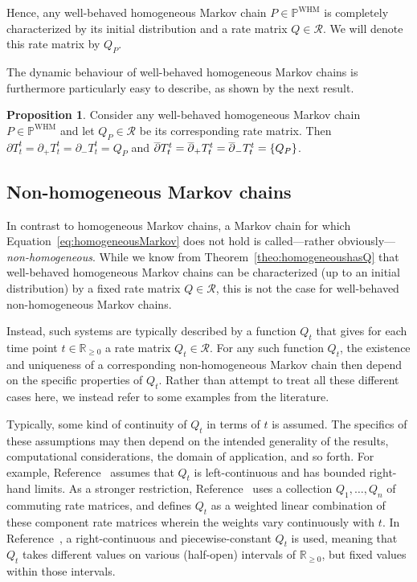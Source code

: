 \documentclass[10pt,a4paper]{paper}
\theoremstyle{definition}
\newtheorem{proposition}[theorem]{Proposition}
\newcommand{\reals}{\mathbb{R}}
\newcommand{\realsnonneg}{\reals_{\geq 0}}
\newcommand{\processes}{\mathbb{P}}
\newcommand{\whmprocesses}{\processes^{\mathrm{WHM}}}
\begin{document}
Hence, any well-behaved homogeneous Markov chain $P\in\whmprocesses$ is completely characterized by its initial distribution and a rate matrix $Q\in\mathcal{R}$. We will denote this rate matrix by $Q_P$.


The dynamic behaviour of well-behaved homogeneous Markov chains is furthermore particularly easy to describe, as shown by the next result.
\begin{proposition}\label{prop:Q_is_singleton_deriv_for_homogen}
Consider any well-behaved homogeneous Markov chain $P\in\whmprocesses$ and let $Q_P\in\mathcal{R}$ be its corresponding rate matrix. Then $\partial T_t^t=\partial_+T_t^t=\partial_-T_t^t=Q_P$ and $\smash{\overline{\partial}}T_t^t=\smash{\overline{\partial}_+}T_t^t=\smash{\overline{\partial}_-}T_t^t=\{Q_P\}$.%
\end{proposition}

\subsection{Non-homogeneous Markov chains}\label{sec:nonhomogen_markov}

In contrast to homogeneous Markov chains, a Markov chain for which Equation~\eqref{eq:homogeneousMarkov} does not hold is called---rather obviously---\emph{non-homogeneous}. While we know from Theorem~\ref{theo:homogeneoushasQ} that well-behaved homogeneous Markov chains can be characterized (up to an initial distribution) by a fixed rate matrix $Q\in\mathcal{R}$, this is not the case for well-behaved non-homogeneous Markov chains. 

Instead, such systems are typically described by a function $Q_t$ that gives for each time point $t\in\realsnonneg$ a rate matrix $Q_t\in\mathcal{R}$. For any such function $Q_t$, the existence and uniqueness of a corresponding non-homogeneous Markov chain then depend on the specific properties of $Q_t$. Rather than attempt to treat all these different cases here, we instead refer to some examples from the literature. 

Typically, some kind of continuity of $Q_t$ in terms of $t$ is assumed. The specifics of these assumptions may then depend on the intended generality of the results, computational considerations, the domain of application, and so forth. For example, Reference~\cite{aalen1978empirical} assumes that $Q_t$ is left-continuous and has bounded right-hand limits. As a stronger restriction, Reference~\cite{johnson1989nonhomogeneous} uses a collection $Q_1,\ldots,Q_n$ of commuting rate matrices, and defines $Q_t$ as a weighted linear combination of these component rate matrices wherein the weights vary continuously with $t$. In Reference~\cite{rindos1995exact}, a right-continuous and piecewise-constant $Q_t$ is used, meaning that $Q_t$ takes different values on various (half-open) intervals of $\realsnonneg$, but fixed values within those intervals.
\end{document}
